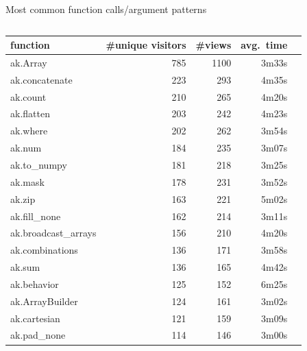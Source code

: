 \documentclass[aspectratio=169]{beamer}
\begin{document}
\begin{frame}[fragile]{Most common function calls/argument patterns}
\begin{uncoverenv}
\begin{columns}
{\begin{minipage}{0.5\linewidth}
\vspace{0.1 cm}
\begin{tabular}{l r r r r}
function & \hspace{-1 cm}\#unique visitors & \#views & avg.\ time \\\hline
ak.Array & 785 & 1100 & 3m33s \\
ak.concatenate & 223 & 293 & 4m35s \\
ak.count & 210 & 265 & 4m20s \\
ak.flatten & 203 & 242 & 4m23s \\
ak.where & 202 & 262 & 3m54s \\
ak.num & 184 & 235 & 3m07s \\
ak.to\_numpy & 181 & 218 & 3m25s \\
ak.mask & 178 & 231 & 3m52s \\
ak.zip & 163 & 221 & 5m02s \\
ak.fill\_none & 162 & 214 & 3m11s \\
ak.broadcast\_arrays & 156 & 210 & 4m20s \\
ak.combinations & 136 & 171 & 3m58s \\
ak.sum & 136 & 165 & 4m42s \\
ak.behavior & 125 & 152 & 6m25s \\
ak.ArrayBuilder & 124 & 161 & 3m02s \\
ak.cartesian & 121 & 159 & 3m09s \\
ak.pad\_none & 114 & 146 & 3m00s \\
\end{tabular}
\end{minipage}}
\end{columns}
\end{uncoverenv}
\vspace{10.05 cm}
\end{frame}
\end{document}
